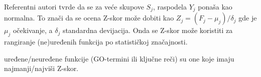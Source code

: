 
Referentni autori tvrde da se za veće skupove $S_j$, raspodela
$Y_j$ ponaša kao normalna. To znači da se ocena Z-skor može dobiti kao
$Z_j=(F_j-\mu_j)/\delta_j$ gde je $\mu_j$ očekivanje, a $\delta_j$ standardna
devijacija. Onda se Z-skor može koristiti za rangiranje (ne)uređenih funkcija
po statističkoj značajnosti.
\begin{definicija}
  \label{stat_naj}
   uređene/neuređene funkcije
  (GO-termini ili ključne reči) su one koje imaju najmanji/najviši Z-skor.
\end{definicija}


